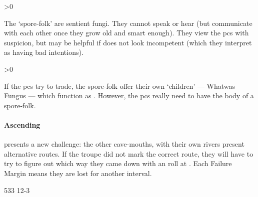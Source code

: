 \documentclass[10pt,twoside]{book}
\begin{document}
\randomize

\sporeFolk

\ifnum\value{Charisma}>0
  {\small\showStdSpells}
\fi

The `spore-folk' are sentient fungi.
They cannot speak or hear (but communicate with each other once they grow old and smart enough).
They view the \glspl{pc} with suspicion, but may be helpful if  does not look incompetent (which they interpret as having bad intentions).

\sporeFolk

\ifnum\value{Charisma}>0
  {\small\showStdSpells}
\fi

If the \glspl{pc} try to trade, the spore-folk offer their own `children' --- Whatwas Fungus --- which function as .
However, the \glspl{pc} really need to have the body of a spore-folk.

\wotWosFungus

\showTalisman


\paragraph{Ascending}
presents a new challenge: the other cave-mouths, with their own rivers present alternative routes.
If the troupe did not mark the correct route, they will have to try to figure out which way they came down with an  roll at \tn[10].
Each Failure Margin means they are lost for another \gls{interval}.

\clearpage

%
  {{5}{3}{3}}%
  {{1}{2}{-3}}%
  {
  }%
  {\lucky}%
  {}%
  {\flight \quadruped {}}%

\label{theDragon}

{
  \scriptsize
}
\end{document}
